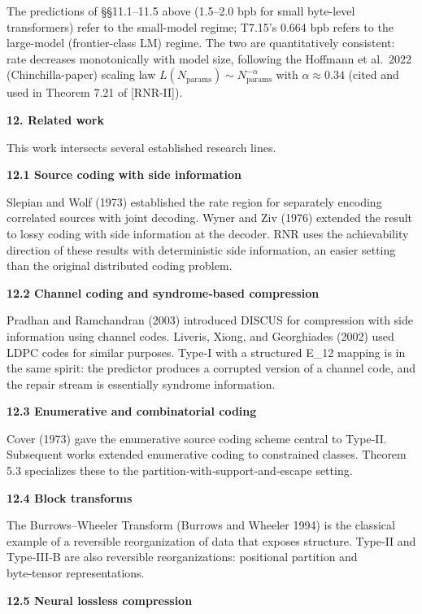 \documentclass[
]{article}
\begin{document}
The predictions of §§11.1--11.5 above (1.5--2.0 bpb for small
byte-level transformers) refer to the small-model regime; T7.15's
0.664 bpb refers to the large-model (frontier-class LM) regime. The
two are quantitatively consistent: rate decreases monotonically with
model size, following the Hoffmann et al.\ 2022 (Chinchilla-paper)
scaling law $L(N_{\mathrm{params}}) \sim N_{\mathrm{params}}^{-\alpha}$
with $\alpha \approx 0.34$ (cited and used in Theorem 7.21 of [RNR-II]).

\textbf{12. Related work}

This work intersects several established research lines.

\textbf{12.1 Source coding with side information}

Slepian and Wolf (1973) established the rate region for separately
encoding correlated sources with joint decoding. Wyner and Ziv (1976)
extended the result to lossy coding with side information at the
decoder. RNR uses the achievability direction of these results with
deterministic side information, an easier setting than the original
distributed coding problem.

\textbf{12.2 Channel coding and syndrome‑based compression}

Pradhan and Ramchandran (2003) introduced DISCUS for compression with
side information using channel codes. Liveris, Xiong, and Georghiades
(2002) used LDPC codes for similar purposes. Type‑I with a structured
E\_12 mapping is in the same spirit: the predictor produces a corrupted
version of a channel code, and the repair stream is essentially syndrome
information.

\textbf{12.3 Enumerative and combinatorial coding}

Cover (1973) gave the enumerative source coding scheme central to
Type‑II. Subsequent works extended enumerative coding to constrained
classes. Theorem 5.3 specializes these to the
partition‑with‑support‑and‑escape setting.

\textbf{12.4 Block transforms}

The Burrows--Wheeler Transform (Burrows and Wheeler 1994) is the
classical example of a reversible reorganization of data that exposes
structure. Type‑II and Type‑III‑B are also reversible reorganizations:
positional partition and byte‑tensor representations.

\textbf{12.5 Neural lossless compression}
\end{document}
